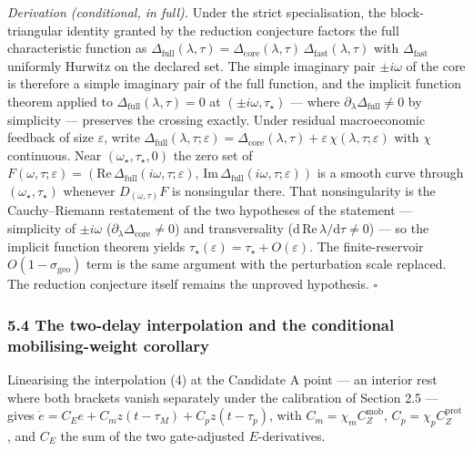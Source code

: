 \documentclass[11pt]{article}
\begin{document}
\emph{Derivation (conditional, in full).} Under the strict
specialisation, the block-triangular identity granted by the reduction
conjecture factors the full characteristic function as
\(\Delta_{\mathrm{full}}(\lambda,\tau) = \Delta_{\mathrm{core}}(\lambda,\tau)\,\Delta_{\mathrm{fast}}(\lambda,\tau)\)
with \(\Delta_{\mathrm{fast}}\) uniformly Hurwitz on the declared set.
The simple imaginary pair \(\pm i\omega\) of the core is therefore a
simple imaginary pair of the full function, and the implicit function
theorem applied to \(\Delta_{\mathrm{full}}(\lambda,\tau) = 0\) at
\((\pm i\omega, \tau_\star)\) --- where
\(\partial_\lambda \Delta_{\mathrm{full}} \ne 0\) by simplicity ---
preserves the crossing exactly. Under residual macroeconomic feedback of
size \(\varepsilon\), write
\(\Delta_{\mathrm{full}}(\lambda,\tau;\varepsilon) = \Delta_{\mathrm{core}}(\lambda,\tau) + \varepsilon\,\chi(\lambda,\tau;\varepsilon)\)
with \(\chi\) continuous. Near \((\omega_\star, \tau_\star, 0)\) the
zero set of
\(F(\omega,\tau;\varepsilon) = (\mathrm{Re}\,\Delta_{\mathrm{full}}(i\omega,\tau;\varepsilon),\, \mathrm{Im}\,\Delta_{\mathrm{full}}(i\omega,\tau;\varepsilon))\)
is a smooth curve through \((\omega_\star, \tau_\star)\) whenever
\(D_{(\omega,\tau)}F\) is nonsingular there. That nonsingularity is the
Cauchy--Riemann restatement of the two hypotheses of the statement ---
simplicity of \(\pm i\omega\)
(\(\partial_\lambda \Delta_{\mathrm{core}} \ne 0\)) and transversality
(\(\mathrm{d}\,\mathrm{Re}\,\lambda/\mathrm{d}\tau \ne 0\)) --- so the
implicit function theorem yields
\(\tau_\star(\varepsilon) = \tau_\star + O(\varepsilon)\). The
finite-reservoir \(O(1-\sigma_{\mathrm{geo}})\) term is the same
argument with the perturbation scale replaced. The reduction conjecture
itself remains the unproved hypothesis. \ensuremath{\square}

\subsubsection{5.4 The two-delay interpolation and the conditional
mobilising-weight
corollary}\label{the-two-delay-interpolation-and-the-conditional-mobilising-weight-corollary}

Linearising the interpolation (4) at the Candidate A point --- an
interior rest where both brackets vanish separately under the
calibration of Section 2.5 --- gives
\(\dot e = C_E e + C_m z(t-\tau_M) + C_p z(t-\tau_p)\), with
\(C_m = \chi_m C_Z^{\mathrm{mob}}\),
\(C_p = \chi_p C_Z^{\mathrm{prot}}\), and \(C_E\) the sum of the two
gate-adjusted \(E\)-derivatives.
\end{document}
